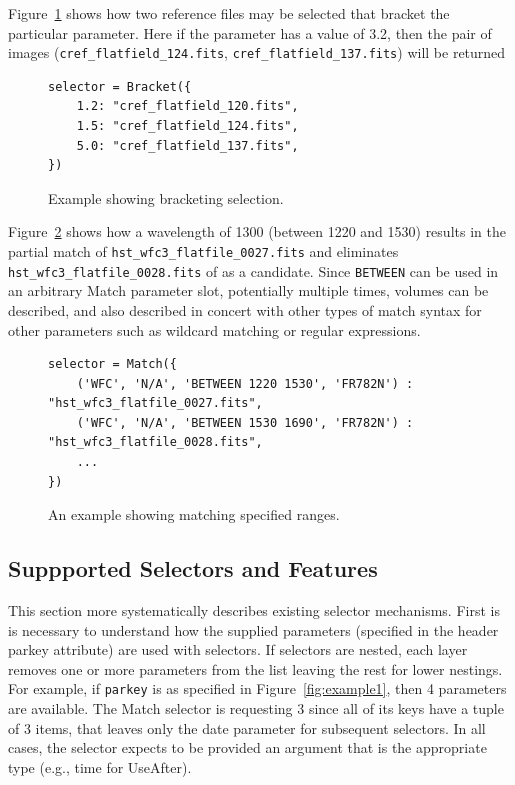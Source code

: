 \documentclass[final,authoryear,5p,times,twocolumn]{elsarticle}
\begin{document}
Figure~\ref{fig:example3} shows how two reference files may be selected
that bracket the particular parameter. Here if the parameter has a value 
of 3.2, then the pair of images 
(\texttt{cref\_flatfield\_124.fits}, \texttt{cref\_flatfield\_137.fits}) will be returned

\begin{figure}
\begin{verbatim}
selector = Bracket({
    1.2: "cref_flatfield_120.fits",
    1.5: "cref_flatfield_124.fits",
    5.0: "cref_flatfield_137.fits",
})
\end{verbatim}
\caption{Example showing bracketing selection.}
\label{fig:example3}
\end{figure}

Figure~\ref{fig:example4} shows how a
wavelength of 1300 (between 1220 and 1530) results in the partial match 
of \texttt{hst\_wfc3\_flatfile\_0027.fits} and eliminates 
\texttt{hst\_wfc3\_flatfile\_0028.fits}
of as a candidate.   Since \texttt{BETWEEN}
can be used in an arbitrary Match parameter
slot,  potentially multiple times,  volumes can be described, and also
described in concert with other types of match syntax for other parameters
such as wildcard matching or regular expressions.

\begin{figure}
\begin{verbatim}
selector = Match({
    ('WFC', 'N/A', 'BETWEEN 1220 1530', 'FR782N') :  "hst_wfc3_flatfile_0027.fits",
    ('WFC', 'N/A', 'BETWEEN 1530 1690', 'FR782N') :  "hst_wfc3_flatfile_0028.fits",
    ...
})
\end{verbatim}
\caption{An example showing matching specified ranges.}
\label{fig:example4}
\end{figure}

\subsection{Suppported Selectors and Features}

This section more systematically describes existing selector mechanisms. 
First is is necessary to understand how the supplied parameters (specified
in the header parkey attribute) are used with selectors. If selectors are 
nested, each layer removes one or more parameters from the list leaving 
the rest for lower nestings. For example, if \texttt{parkey} is as specified in
Figure~\ref{fig:example1}, then 4 parameters are available. The Match 
selector is requesting 3 since all of its keys have a tuple of 3 items,
that leaves only the date parameter for subsequent selectors.
In all cases, the selector expects to be provided an argument that is the 
appropriate type (e.g., time for UseAfter). 
\end{document}
